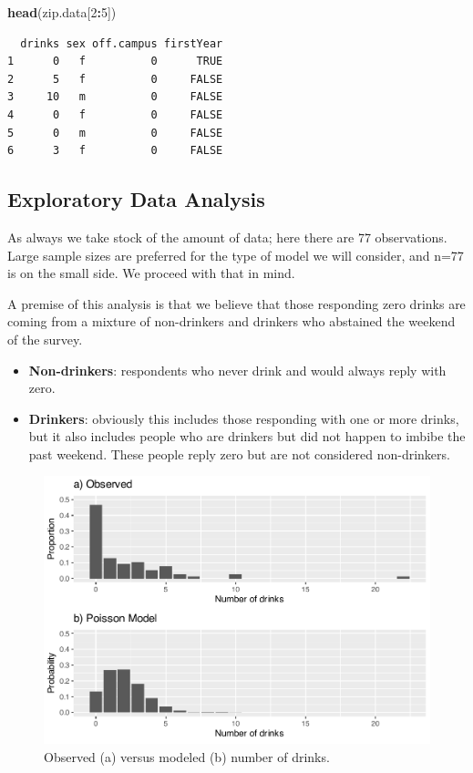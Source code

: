 \documentclass[
]{krantz}
\newenvironment{Shaded}{\begin{snugshade}}{\end{snugshade}}
\newcommand{\DecValTok}[1]{\textcolor[rgb]{0.06,0.06,0.06}{#1}}
\newcommand{\FunctionTok}[1]{\textcolor[rgb]{0.27,0.27,0.27}{\textbf{#1}}}
\newcommand{\NormalTok}[1]{#1}
\newcommand{\SpecialCharTok}[1]{\textcolor[rgb]{0.43,0.43,0.43}{\textbf{#1}}}
\providecommand{\tightlist}{%
  \setlength{\itemsep}{0pt}\setlength{\parskip}{0pt}}
\begin{document}
\begin{Shaded}
\begin{Highlighting}[]
\FunctionTok{head}\NormalTok{(zip.data[}\DecValTok{2}\SpecialCharTok{:}\DecValTok{5}\NormalTok{])}
\end{Highlighting}
\end{Shaded}

\begin{verbatim}
  drinks sex off.campus firstYear
1      0   f          0      TRUE
2      5   f          0     FALSE
3     10   m          0     FALSE
4      0   f          0     FALSE
5      0   m          0     FALSE
6      3   f          0     FALSE
\end{verbatim}

\subsection{Exploratory Data Analysis}\label{exploratory-data-analysis-1}

As always we take stock of the amount of data; here there are 77 observations. Large sample sizes are preferred for the type of model we will consider, and n=77 is on the small side. We proceed with that in mind.

A premise of this analysis is that we believe that those responding zero drinks are coming from a mixture of non-drinkers and drinkers who abstained the weekend of the survey.

\begin{itemize}
\tightlist
\item
  \textbf{Non-drinkers}: respondents who never drink and would always reply with zero.
\item
  \textbf{Drinkers}: obviously this includes those responding with one or more drinks, but it also includes people who are drinkers but did not happen to imbibe the past weekend. These people reply zero but are not considered non-drinkers.
\end{itemize}

\begin{figure}

{\centering \includegraphics[width=0.6\linewidth]{bookdown-BeyondMLR_files/figure-latex/obsVmodel-1} 

}

\caption{Observed (a) versus modeled (b) number of drinks.}\label{fig:obsVmodel}
\end{figure}
\end{document}
